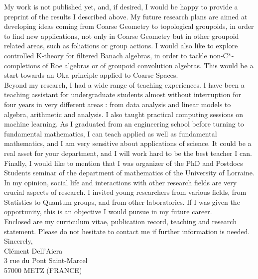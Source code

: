 My work is not published yet, and, if desired, I would be happy to provide a preprint of the results I described above. My future research plans are aimed at developing ideas coming from Coarse Geometry to topological groupoids, in order to find new applications, not only in Coarse Geometry but in other groupoid related areas, such as foliations or group actions. I would also like to explore controlled K-theory for filtered Banach algebras, in order to tackle non-C*-completions of Roe algebras or of groupoid convolution algebras. This would be a start towards an Oka principle applied to Coarse Spaces. \\

Beyond my research, I had a wide range of teaching experiences. I have been a teaching assistant for undergraduate students almost without interruption for four years in very different areas : from data analysis and linear models to algebra, arithmetic and analysis. I also taught practical computing sessions on machine learning. As I graduated from an engineering school before turning to fundamental mathematics, I can teach applied as well as fundamental mathematics, and I am very sensitive about applications of science. It could be a real asset for your department, and I will work hard to be the best teacher I can. \\

Finally, I would like to mention that I was organizer of the PhD and Postdocs Students seminar of the department of mathematics of the University of Lorraine. In my opinion, social life and interactions with other research fields are very crucial aspects of research. I invited young researchers from various fields, from Statistics to Quantum groups, and from other laboratories. If I was given the opportunity, this is an objective I would pursue in my future career. \\

Enclosed are my curriculum vitae, publication record, teaching and research statement. Please do not hesitate to contact me if further information is needed. \\

Sincerely,\\

Clément Dell’Aiera\\
3 rue du Pont Saint-Marcel\\
57000 METZ (FRANCE)\\
